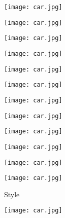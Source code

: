 \begin{flushleft}
\begin{flushleft}
\begin{figure}[h!]
\begin{subfigure}[b]{0.225\linewidth}
		\texttt{[image: car.jpg]} %
	\end{subfigure}
	\begin{subfigure}[b]{0.225\linewidth}
		\texttt{[image: car.jpg]} %
	\end{subfigure}
	\begin{subfigure}[b]{0.225\linewidth}
		\texttt{[image: car.jpg]} %
	\end{subfigure}
	\centering
	\begin{subfigure}[b]{0.225\linewidth}
		\texttt{[image: car.jpg]} %
	\end{subfigure}
	\begin{subfigure}[b]{0.225\linewidth}
		\texttt{[image: car.jpg]} %
	\end{subfigure}
	\begin{subfigure}[b]{0.225\linewidth}
		\texttt{[image: car.jpg]} %
	\end{subfigure}
	\begin{subfigure}[b]{0.225\linewidth}
		\texttt{[image: car.jpg]} %
	\end{subfigure}
	\centering
	\begin{subfigure}[b]{0.225\linewidth}
		\texttt{[image: car.jpg]} %
	\end{subfigure}
	\begin{subfigure}[b]{0.225\linewidth}
		\texttt{[image: car.jpg]} %
	\end{subfigure}
	\begin{subfigure}[b]{0.225\linewidth}
		\texttt{[image: car.jpg]} %
	\end{subfigure}
	\begin{subfigure}[b]{0.225\linewidth}
		\texttt{[image: car.jpg]} %
	\end{subfigure}
	\centering
	\begin{subfigure}[b]{0.225\linewidth}
		\texttt{[image: car.jpg]} %
		\caption{Style}
	\end{subfigure}
	\begin{subfigure}[b]{0.225\linewidth}
		\texttt{[image: car.jpg]} %

\end{subfigure}
\end{figure}
\end{flushleft}
\end{flushleft}
